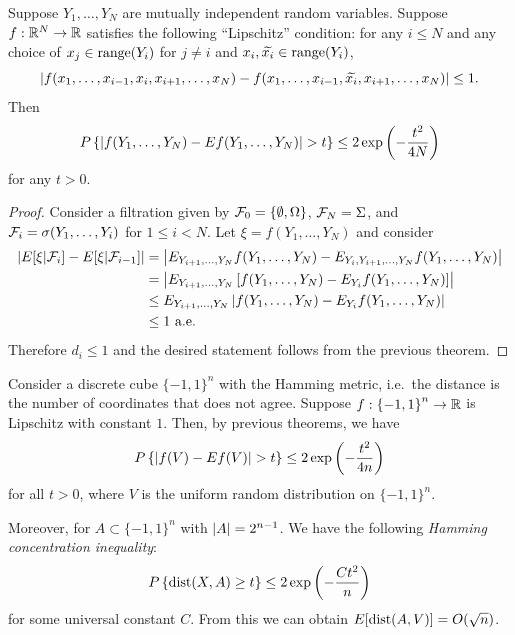 \documentclass[a4paper]{article}
\begin{document}
\begin{cor}
  Suppose $Y_1, \dots, Y_N$ are mutually independent random
  variables. Suppose $f : \mathbb{R}^N \to \mathbb{R}$ satisfies the
  following ``Lipschitz'' condition: for any
  $i \leq N$ and any choice of $x_j \in \operatorname{range} (Y_i)$
  for $j \neq i$ and $x_i, \widetilde{x_i} \in \operatorname{range} (Y_i)$,
  \[
    \left\lvert f(x_1, \dots, x_{i - 1}, x_i,
      x_{i + 1}, \dots, x_N) - f(x_1, \dots, x_{i - 1}, \widetilde{x_i},
      x_{i + 1}, \dots, x_N)\right\rvert \leq 1.
  \]
  Then
  \[
    P \left\{ \left\lvert f(Y_1, \dots, Y_N) - E f(Y_1, \dots, Y_N)\right\rvert > t \right\}
    \leq 2 \exp \left( - \frac{t^2}{4 N} \right)
  \]
  for any $t > 0$.
\end{cor}

\begin{proof}
  Consider a filtration given by $\mathcal{F}_0 = \{ \emptyset, \Omega \}$,
  $\mathcal{F}_N = \Sigma$, and $\mathcal{F}_i = \sigma(Y_1, \dots, Y_i)$
  for $1 \leq i < N$. Let $\xi = f (Y_1, \dots, Y_N)$ and consider
  \begin{align*}
    \left\lvert E [\xi | \mathcal{F}_i] - E [\xi | \mathcal{F}_{i - 1}]\right\rvert
     & = \left\lvert E_{Y_{i+1}, \dots, Y_N} f(Y_1, \dots, Y_N)
           - E_{Y_i, Y_{i+1}, \dots, Y_N} f(Y_1, \dots, Y_N)\right\rvert              \\
     & = \left\lvert E_{Y_{i+1}, \dots, Y_N}
           \left[ f(Y_1, \dots, Y_N) - E_{Y_i} f(Y_1, \dots, Y_N) \right]\right\rvert \\
     & \leq E_{Y_{i+1}, \dots, Y_N}
    \left\lvert  f(Y_1, \dots, Y_N) - E_{Y_i} f(Y_1, \dots, Y_N) \right\rvert                \\
     & \leq 1 \text{ a.e.}
  \end{align*}
  Therefore $d_i \leq 1$ and the desired statement follows from the
  previous theorem.

\end{proof}

\begin{eg}
  Consider a discrete cube $\{-1, 1\}^n$ with the Hamming metric, i.e.\
  the distance is the number of coordinates that does not agree.
  Suppose $f : \left\{ -1, 1 \right\}^n \to \mathbb{R}$ is Lipschitz
  with constant $1$. Then, by previous theorems, we have
  \[
    P \left\{ \left\lvert f(V) - E f(V)\right\rvert > t \right\}
    \leq 2 \exp \left( - \frac{t^2}{4 n} \right)
  \]
  for all $t > 0$, where $V$ is the uniform random distribution
  on $\{ -1, 1 \}^n$.

  Moreover, for $A \subset \{-1, 1\}^n$ with $\left\lvert A\right\rvert = 2^{n - 1}$.
  We have the following \emph{Hamming concentration inequality}:
  \[
    P \left\{ \operatorname{dist}(X, A) \geq t \right\}
    \leq 2 \exp \left( - \frac{C t^2}{n} \right)
  \]
  for some universal constant $C$.
  From this we can obtain $E [\operatorname{dist} (A, V)] = O(\sqrt{n})$.
\end{eg}
\end{document}

